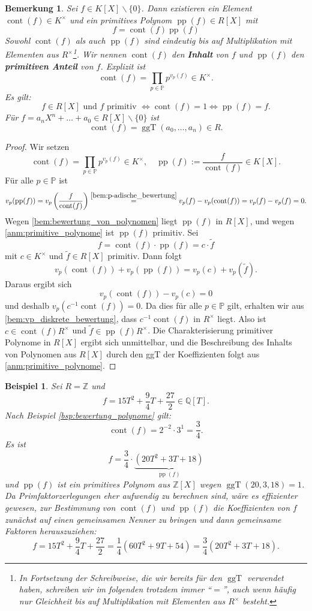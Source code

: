 \documentclass[a4paper, twoside, 11pt, ngerman]{report}
\newcommand{\PP}{\mathds P}
\newcommand{\QQ}{\mathds Q}
\newcommand{\ZZ}{\mathds Z}
\renewcommand{\setminus}{\smallsetminus}
\DeclareMathOperator{\cont}{cont}
\DeclareMathOperator{\ggT}{ggT}
\DeclareMathOperator{\pp}{pp}
\theoremstyle{definistyle}
\newtheorem{bem}[satz]{Bemerkung}
\newtheorem{bsp}[satz]{Beispiel}
\theoremstyle{remark}
\newcommand{\defn}[1]{\textit{\bfseries #1}}
\begin{document}
\begin{bem}\label{bem:primitiver_anteil}
Sei $f \in K[X] \setminus \{0\}$. Dann existieren ein Element $\cont(f)\in K^\times$ und 
ein primitives Polynom $\pp(f)\in R[X]$ mit
\[
f=\cont(f)\pp(f)
\]
Sowohl $\cont(f)$ als auch $\pp(f)$ sind eindeutig bis auf Multiplikation mit Elementen aus $R^\times$\footnote{In Fortsetzung der Schreibweise, die wir bereits für den $\ggT$ verwendet haben, schreiben wir im folgenden trotzdem immer "`$=$"', auch wenn häufig nur Gleichheit bis auf Multiplikation mit Elementen aus $R^\times$ besteht.}. Wir nennen $\cont(f)$ den \defn{Inhalt} von $f$ und $\pp(f)$ den \defn{primitiven Anteil} von $f$. Explizit ist
\[
\cont(f)=\prod_{p \in \mathbb{P}} p^{v_p(f)}\in K^\times.
\]
Es gilt:
\[
f\in R[X] \text{ und } f \text{ primitiv } \iff \cont(f)=1 \iff \pp(f)=f. 
\]
Für $f=a_nX^n+\ldots+a_0\in R[X]\setminus\{0\}$ ist
\[
\cont(f)=\ggT(a_0, \ldots, a_n)\in R.
\]
\end{bem}
\begin{proof}
Wir setzen
\[
\cont(f)=\prod_{p \in \mathbb{P}} p^{v_p(f)}\in K^\times, \quad \pp(f) := \frac{f}{\cont(f)} \in K[X].
\]
Für alle $p \in \mathbb{P}$ ist
\[
v_p(\pp(f)) = v_p\left(\frac{f}{\cont(f)}\right) \stackrel{\ref{bem:p-adische_bewertung}}{=} v_p(f) - v_p(\cont(f)) = v_p(f) - v_p(f) = 0.
\]
Wegen \ref{bem:bewertung_von_polynomen} liegt $\pp(f)$ in $R[X]$, und wegen \ref{anm:primitive_polynome} ist $\pp(f)$ primitiv.
Sei
\[
f = \cont(f) \cdot \pp(f) = c \cdot \tilde{f}
\]
mit $c \in K^\times$ und $\tilde{f} \in R[X]$ primitiv. Dann folgt
\[
v_p(\cont(f)) + v_p(\pp(f)) = v_p(c) + v_p(\tilde{f}).
\]
Daraus ergibt sich
\[
v_p(\cont(f)) - v_p(c) = 0 
\]
und deshalb $v_p\left(c^{-1}\cont(f)\right) = 0$.
Da dies für alle $p\in\PP$ gilt, erhalten wir aus \ref{bem:vp_diskrete_bewertung}, dass $c^{-1}\cont(f)$
in $R^\times$ liegt. Also ist $c \in \cont(f)R^\times$ und $\tilde{f} \in \pp(f)R^\times$. Die Charakterisierung
primitiver Polynome in $R[X]$ ergibt sich unmittelbar, und die Beschreibung des Inhalts von Polynomen aus $R[X]$ durch
den ggT der Koeffizienten folgt aus \ref{anm:primitive_polynome}.
\end{proof}

\begin{bsp}\label{bsp:inhalt_und_bewertung}
Sei $R = \ZZ$ und
\[
f = 15 T^2 + \frac{9}{4} T + \frac{27}{2} \in \QQ[T].
\]
Nach Beispiel \ref{bsp:bewertung_polynome} gilt:
\[
\cont(f) = 2^{-2} \cdot 3^1 = \frac{3}{4}.
\]
Es ist
\[
f = \frac{3}{4} \cdot \underbrace{(20T^2 + 3T + 18)}_{\pp(f)}
\]
und $\pp(f)$ ist ein primitives Polynom aus $\ZZ[X]$ wegen $\ggT(20, 3, 18) = 1$.
Da Primfaktorzerlegungen eher aufwendig zu berechnen sind, wäre es effizienter gewesen,
zur Bestimmung von $\cont(f)$ und $\pp(f)$ die Koeffizienten von $f$ zunächst auf einen gemeinsamen Nenner zu bringen und dann gemeinsame Faktoren herauszuziehen:
\[
f= 15 T^2 + \frac{9}{4} T + \frac{27}{2}=\frac{1}{4}(60T^2+9T+54)=\frac{3}{4}(20T^2+3T+18).
\]
\end{bsp}
\end{document}
